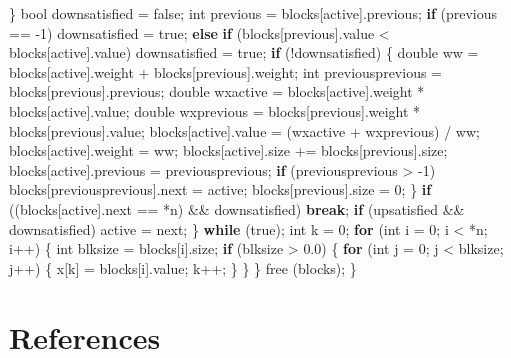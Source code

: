 \documentclass[12pt,]{article}
\newenvironment{Shaded}{\begin{snugshade}}{\end{snugshade}}
\newcommand{\DataTypeTok}[1]{\textcolor[rgb]{0.13,0.29,0.53}{#1}}
\newcommand{\DecValTok}[1]{\textcolor[rgb]{0.00,0.00,0.81}{#1}}
\newcommand{\FloatTok}[1]{\textcolor[rgb]{0.00,0.00,0.81}{#1}}
\newcommand{\ControlFlowTok}[1]{\textcolor[rgb]{0.13,0.29,0.53}{\textbf{#1}}}
\newcommand{\NormalTok}[1]{#1}
\begin{document}
\begin{Shaded}
\begin{Highlighting}[]
\NormalTok{        \}}
\NormalTok{        bool downsatisfied = false;}
        \DataTypeTok{int}\NormalTok{ previous = blocks[active].previous;}
        \ControlFlowTok{if}\NormalTok{ (previous == -}\DecValTok{1}\NormalTok{) downsatisfied = true;}
        \ControlFlowTok{else} \ControlFlowTok{if}\NormalTok{ (blocks[previous].value < blocks[active].value) }
\NormalTok{            downsatisfied = true;}
        \ControlFlowTok{if}\NormalTok{ (!downsatisfied) \{}
            \DataTypeTok{double}\NormalTok{ ww = blocks[active].weight + blocks[previous].weight;}
            \DataTypeTok{int}\NormalTok{ previousprevious = blocks[previous].previous;}
            \DataTypeTok{double}\NormalTok{ wxactive = blocks[active].weight * blocks[active].value;}
            \DataTypeTok{double}\NormalTok{ wxprevious = blocks[previous].weight * blocks[previous].value;}
\NormalTok{            blocks[active].value = (wxactive + wxprevious) / ww;}
\NormalTok{            blocks[active].weight = ww;}
\NormalTok{            blocks[active].size += blocks[previous].size;}
\NormalTok{            blocks[active].previous = previousprevious;}
            \ControlFlowTok{if}\NormalTok{ (previousprevious > -}\DecValTok{1}\NormalTok{)}
\NormalTok{                blocks[previousprevious].next = active;}
\NormalTok{            blocks[previous].size = }\DecValTok{0}\NormalTok{;}
\NormalTok{        \}}
        \ControlFlowTok{if}\NormalTok{ ((blocks[active].next == *n) && downsatisfied) }\ControlFlowTok{break}\NormalTok{;}
        \ControlFlowTok{if}\NormalTok{ (upsatisfied && downsatisfied) active = next;}
\NormalTok{    \} }\ControlFlowTok{while}\NormalTok{ (true);}
    \DataTypeTok{int}\NormalTok{ k = }\DecValTok{0}\NormalTok{;}
    \ControlFlowTok{for}\NormalTok{ (}\DataTypeTok{int}\NormalTok{ i = }\DecValTok{0}\NormalTok{; i < *n; i++) \{}
        \DataTypeTok{int}\NormalTok{ blksize = blocks[i].size;}
        \ControlFlowTok{if}\NormalTok{ (blksize > }\FloatTok{0.0}\NormalTok{) \{}
            \ControlFlowTok{for}\NormalTok{ (}\DataTypeTok{int}\NormalTok{ j = }\DecValTok{0}\NormalTok{; j < blksize; j++) \{}
\NormalTok{                x[k] = blocks[i].value;}
\NormalTok{                k++;}
\NormalTok{            \}}
\NormalTok{        \}}
\NormalTok{    \}}
\NormalTok{    free (blocks);}
\NormalTok{\}}
\end{Highlighting}
\end{Shaded}

\section*{References}\label{references}
\end{document}
